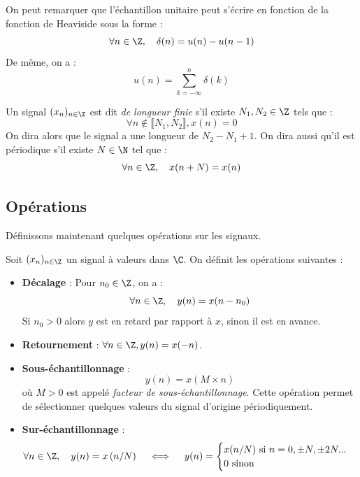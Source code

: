 \begin{remark}
    On peut remarquer que l'échantillon unitaire peut s'écrire en fonction de la fonction 
    de Heaviside sous la forme : 
        $$ \forall n \in \Z, \quad \delta(n) = u(n) - u(n-1) $$ 
    De même, on a : 
        $$ u(n) = \sum_{k = - \infty}^{n} \delta(k) $$ 
\end{remark}

\begin{definition}
    Un signal $(x_n)_{n \in \Z}$ est dit \emph{de longueur finie} s'il 
    existe $ N_1, N_2 \in \Z$ tels que : 
        \begin{equation}
            \forall n \not \in \llbracket N_1, N_2 \rrbracket, x(n) = 0 
        \end{equation}
    On dira alors que le signal a une longueur de $N_2 - N_1 + 1$. 
    On dira aussi qu'il est périodique s'il existe $ N \in \N$ tel que : 
        \begin{equation}
            \forall n \in \Z, \quad x(n + N) = x(n) 
        \end{equation}
\end{definition}

\subsection{Opérations}

Définissons maintenant quelques opérations sur les signaux. 

\begin{definition}[Opérations]
    Soit $(x_n)_{n \in \Z}$ un signal à valeurs dans $\C$. On définit les opérations suivantes : 
    \begin{itemize} 
        \item \textbf{Décalage} : Pour $n_0 \in \Z$, on a : 
            $$ \forall n \in \Z, \quad y(n) = x(n - n_0) $$ 
        Si $n_0 > 0$ alors $y$ est en retard par rapport à $x$, sinon il est en 
        avance. 
        \item \textbf{Retournement} : $ \forall n \in \Z, y(n) = x(-n) $. 
        \item \textbf{Sous-échantillonnage} : 
            $$ y(n) = x(M \times n) $$
        où $M > 0$ est appelé \emph{facteur de sous-échantillonnage}. 
        Cette opération permet de sélectionner quelques valeurs du signal d'origine 
        périodiquement. 
        \item \textbf{Sur-échantillonnage} :
            $$ \forall n \in \Z, \quad 
                y(n) = x \left(n / N\right) 
                \quad \iff \quad 
                y(n) = 
                \begin{cases}
                    x(n/N) \text{ si } n = 0, \pm N, \pm 2N... \\ 
                    0 \text{ sinon }  
                \end{cases}
            $$
    \end{itemize}
\end{definition}

